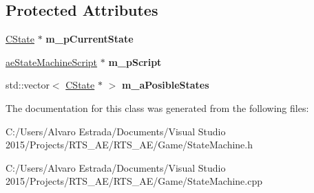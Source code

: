 \subsection*{Protected Attributes}
\begin{DoxyCompactItemize}
\item 
\hyperlink{class_c_state}{C\+State} $\ast$ {\bfseries m\+\_\+p\+Current\+State}\hypertarget{classae_state_machine_ac489d362038343fe9cbe1bf2a97df8d8}{}\label{classae_state_machine_ac489d362038343fe9cbe1bf2a97df8d8}

\item 
\hyperlink{classae_state_machine_script}{ae\+State\+Machine\+Script} $\ast$ {\bfseries m\+\_\+p\+Script}\hypertarget{classae_state_machine_ab9ca9e9ed387fd0c0913b206f63ad902}{}\label{classae_state_machine_ab9ca9e9ed387fd0c0913b206f63ad902}

\item 
std\+::vector$<$ \hyperlink{class_c_state}{C\+State} $\ast$ $>$ {\bfseries m\+\_\+a\+Posible\+States}\hypertarget{classae_state_machine_a465820778fecdcfd694ae12d57ab5271}{}\label{classae_state_machine_a465820778fecdcfd694ae12d57ab5271}

\end{DoxyCompactItemize}


The documentation for this class was generated from the following files\+:\begin{DoxyCompactItemize}
\item 
C\+:/\+Users/\+Alvaro Estrada/\+Documents/\+Visual Studio 2015/\+Projects/\+R\+T\+S\+\_\+\+A\+E/\+R\+T\+S\+\_\+\+A\+E/\+Game/State\+Machine.\+h\item 
C\+:/\+Users/\+Alvaro Estrada/\+Documents/\+Visual Studio 2015/\+Projects/\+R\+T\+S\+\_\+\+A\+E/\+R\+T\+S\+\_\+\+A\+E/\+Game/State\+Machine.\+cpp\end{DoxyCompactItemize}

